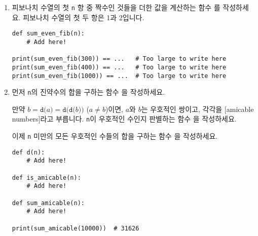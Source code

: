 \documentclass[../main.tex]{subfiles}
\begin{document}
\begin{enumerate}
\item 피보나치 수열의 첫 \verb/n/ 항 중 짝수인 것들을 더한 값을 계산하는 함수 를 작성하세요.
  피보나치 수열의 첫 두 항은 1과 2입니다.

\begin{verbatim}
def sum_even_fib(n):
    # Add here!

print(sum_even_fib(300)) == ...   # Too large to write here
print(sum_even_fib(400)) == ...   # Too large to write here
print(sum_even_fib(1000)) == ...  # Too large to write here
\end{verbatim}

\item 먼저 \verb/n/의 진약수의 합을 구하는 함수 을 작성하세요.

만약 $b = \texttt{d($a$)} = \texttt{d(d($b$))}$ ($a \neq b$)이면, $a$와 $b$는 우호적인 쌍이고, 각각을 [amicable numbers]라고 부릅니다.
\verb/n/이 우호적인 수인지 판별하는 함수 을 작성하세요.

이제 \verb/n/ 미만의 모든 우호적인 수들의 합을 구하는 함수 을 작성하세요.
\begin{verbatim}
def d(n):
    # Add here!

def is_amicable(n):
    # Add here!

def sum_amicable(n):
    # Add here!

print(sum_amicable(10000))  # 31626
\end{verbatim}
\end{enumerate}
\end{document}
